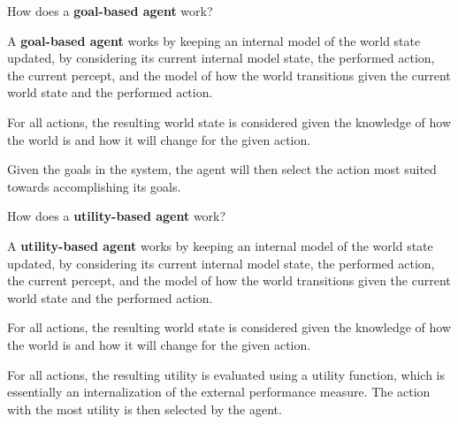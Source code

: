 \begin{flashcard}[Question]{How does a \textbf{goal-based agent} work?}
\begin{center}
A \textbf{goal-based agent} works by keeping an internal model of the world state updated, by considering its current internal model state, the performed action, the current percept, and the model of how the world transitions given the current world state and the performed action.

\medskip

For all actions, the resulting world state is considered given the knowledge of how the world is and how it will change for the given action.

\medskip

Given the goals in the system, the agent will then select the action most suited towards accomplishing its goals.
\end{center}
\end{flashcard}

\begin{flashcard}[Question]{How does a \textbf{utility-based agent} work?}
\begin{center}
A \textbf{utility-based agent} works by keeping an internal model of the world state updated, by considering its current internal model state, the performed action, the current percept, and the model of how the world transitions given the current world state and the performed action.

\medskip

For all actions, the resulting world state is considered given the knowledge of how the world is and how it will change for the given action.

\medskip

For all actions, the resulting utility is evaluated using a utility function, which is essentially an internalization of the external performance measure. The action with the most utility is then selected by the agent.
\end{center}
\end{flashcard}

